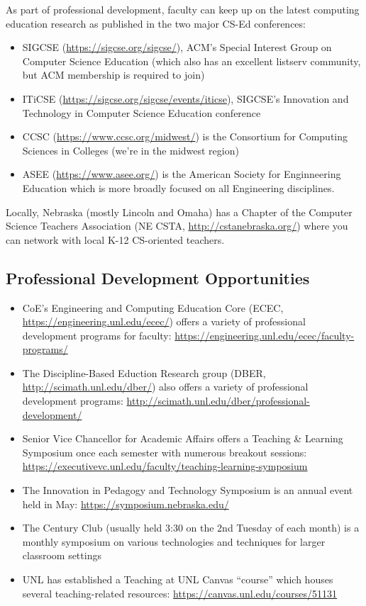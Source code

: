 \documentclass[12pt]{scrartcl}
\begin{document}
As part of professional development, faculty can keep up
on the latest computing education research as published in 
the two major CS-Ed conferences:
\begin{itemize}
  \item SIGCSE (\url{https://sigcse.org/sigcse/}), ACM's Special Interest Group on Computer Science Education (which also has an excellent listserv community, but ACM membership is required to join)
  \item ITiCSE (\url{https://sigcse.org/sigcse/events/iticse}), SIGCSE's Innovation and Technology in Computer Science Education conference
  \item CCSC (\url{https://www.ccsc.org/midwest/}) is the Consortium for Computing Sciences in Colleges (we're in the midwest region)
  \item ASEE (\url{https://www.asee.org/}) is the American Society for Enginneering Education which is more broadly focused on all Engineering disciplines.  
\end{itemize}

Locally, Nebraska (mostly Lincoln and Omaha) has a Chapter of the 
Computer Science Teachers Association (NE CSTA, 
\url{http://cstanebraska.org/}) where you can network with local
K-12 CS-oriented teachers.  

\subsection{Professional Development Opportunities}

\begin{itemize}
  \item CoE's Engineering and Computing Education Core (ECEC,
  \url{https://engineering.unl.edu/ecec/})   
  offers a variety of professional development programs for
  faculty: \url{https://engineering.unl.edu/ecec/faculty-programs/}
  \item The Discipline-Based Eduction Research group (DBER, \url{http://scimath.unl.edu/dber/}) also offers a variety of professional
  development programs: \url{http://scimath.unl.edu/dber/professional-development/}
  \item Senior Vice Chancellor for Academic Affairs offers a 
  Teaching \& Learning Symposium once each semester with numerous
  breakout sessions: \url{https://executivevc.unl.edu/faculty/teaching-learning-symposium}
  \item The Innovation in Pedagogy and Technology Symposium is an 
  annual event held in May: \url{https://symposium.nebraska.edu/}
  \item The Century Club (usually held 3:30 on the 2nd Tuesday of
  each month) is a monthly symposium on various technologies and
  techniques for larger classroom settings
  \item UNL has established a Teaching at UNL Canvas ``course''
  which houses several teaching-related resources: \url{https://canvas.unl.edu/courses/51131}
\end{itemize}
\end{document}
